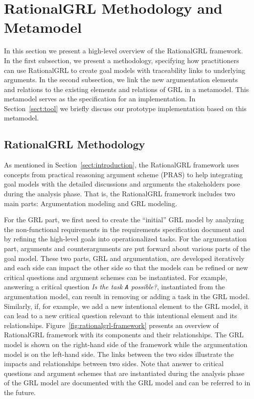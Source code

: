 \section{RationalGRL Methodology and Metamodel}
\label{sect:overview}

In this section we present a high-level overview of the RationalGRL framework. In the first subsection, we present a methodology, specifying how practitioners can use RationalGRL to create goal models with traceability links to underlying arguments. In the second subsection, we link the new argumentation elements and relations to the existing elements and relations of GRL in a metamodel. This metamodel serves as the specification for an implementation. In Section~\ref{sect:tool} we briefly discuss our prototype implementation based on this metamodel.

\subsection{RationalGRL Methodology} 

As mentioned in Section~\ref{sect:introduction}, the RationalGRL framework uses concepts from practical reasoning argument scheme (PRAS) to help integrating goal models with the detailed discussions and arguments the stakeholders pose during the analysis phase. That is, the RationalGRL framework includes two main parts: Argumentation modeling and GRL modeling. 

For the GRL part, we first need to create the ``initial'' GRL model by analyzing the non-functional requirements in the requirements specification document and by refining the high-level goals into operationalized tasks. For the argumentation part, arguments and counterarguments are put forward about various parts of the goal model.
These two parts, GRL and argumentation, are developed iteratively and each side can impact the other side so that the models can be refined or new critical questions and argument schemes can be instantiated. For example, answering a critical question \emph{Is the task \texttt{A} possible?}, instantiated from the argumentation model, can result in removing or adding a task in the GRL model. Similarly,  if, for example, we add a new intentional element to the GRL model, it can lead to a new critical question relevant to this intentional element and its relationships.  Figure~\ref{fig:rationalgrl-framework} presents an overview of RationalGRL framework with its components and their relationships.  The GRL model is shown  on the right-hand side of the framework while the argumentation model is on the left-hand side. The links between the two sides illustrate the impacts and relationships between two sides. Note that answer to critical questions and argument schemes that are instantiated during the analysis phase of the GRL model are documented with the GRL model and can be referred to in the future. 

